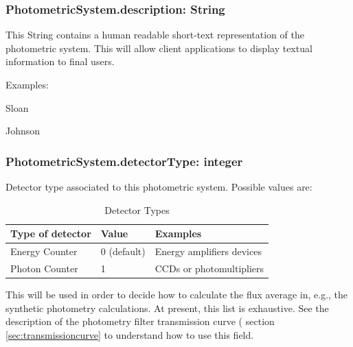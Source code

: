 \documentclass[11pt,a4paper]{ivoa}
\begin{document}
\subsubsection{PhotometricSystem.description: String}
This String contains a human readable short-text representation of the
photometric system. This will allow client applications to display
textual information to final users.
\par

Examples:


Sloan \par
Johnson
\bigskip



\subsubsection{PhotometricSystem.detectorType: integer}
Detector type associated to this photometric system. Possible
values are:




\begin{table}[ht]
 			\centering
\begin{tabular}{p{2.42in}p{0.8in}p{1.55in}}
\hline
\multicolumn{1}{|p{2.42in}}{Type of detector} &
\multicolumn{1}{|p{0.8in}}{Value} &
\multicolumn{1}{|p{1.55in}|}{Examples} \\
\hline
\multicolumn{1}{|p{2.42in}}{Energy Counter} &
\multicolumn{1}{|p{0.8in}}{0 (default)} &
\multicolumn{1}{|p{1.55in}|}{Energy amplifiers devices} \\
\hline
\multicolumn{1}{|p{2.42in}}{Photon Counter} &
\multicolumn{1}{|p{0.8in}}{1} &
\multicolumn{1}{|p{1.55in}|}{CCDs or photomultipliers} \\
\hline
\end{tabular}
\caption{Detector Types}
 \end{table}



This will be used in order to decide how to calculate the
flux average in, e.g., the synthetic photometry calculations.
At present, this list is exhaustive.
See the description of the photometry filter
transmission curve ( section \ref{sec:transmissioncurve} to understand how to use this field.
\par
\end{document}

